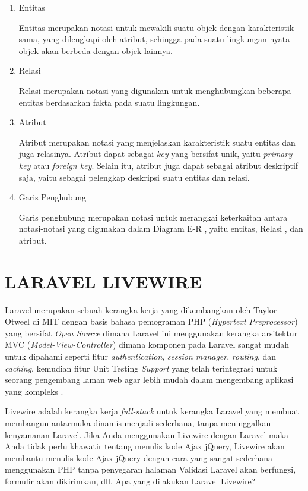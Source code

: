 \begin{enumerate}
	\item Entitas
	\par Entitas merupakan notasi untuk mewakili suatu objek dengan karakteristik sama, yang dilengkapi oleh atribut, sehingga pada suatu lingkungan nyata objek akan berbeda dengan objek lainnya.
	\item Relasi
	\par Relasi merupakan notasi yang digunakan untuk menghubungkan beberapa entitas berdasarkan fakta pada suatu lingkungan.
	\item Atribut
	\par Atribut merupakan notasi yang menjelaskan karakteristik suatu entitas dan juga relasinya. Atribut dapat sebagai \textit{key} yang bersifat unik, yaitu \textit{primary key} atau \textit{foreign key}. Selain itu, atribut juga dapat sebagai atribut deskriptif saja, yaitu sebagai pelengkap deskripsi suatu entitas dan relasi.	
	\item Garis Penghubung
	\par Garis penghubung merupakan notasi untuk merangkai keterkaitan antara notasi-notasi yang digunakan dalam Diagram E-R , yaitu entitas, Relasi , dan atribut.
\end{enumerate}

\section{\uppercase{Laravel Livewire}}
Laravel merupakan sebuah kerangka kerja yang dikembangkan oleh Taylor Otweel di MIT dengan basis bahasa pemograman PHP (\textit{Hypertext Preprocessor}) yang bersifat \textit{Open Source} dimana Laravel ini menggunakan kerangka arsitektur MVC (\textit{Model-View-Controller}) dimana komponen pada Laravel sangat mudah untuk dipahami seperti fitur \textit{authentication}, \textit{session manager}, \textit{routing}, dan \textit{caching}, kemudian fitur Unit Testing \textit{Support} yang telah terintegrasi untuk seorang pengembang laman web agar lebih mudah dalam mengembang aplikasi yang kompleks \citep{sebastian2021perancanagan}.

\par Livewire adalah kerangka kerja \textit{full-stack} untuk kerangka Laravel yang membuat membangun antarmuka dinamis menjadi sederhana, tanpa meninggalkan kenyamanan Laravel. Jika Anda menggunakan Livewire dengan Laravel maka Anda tidak perlu khawatir tentang menulis kode Ajax jQuery, Livewire akan membantu menulis kode Ajax jQuery dengan cara yang sangat sederhana menggunakan PHP tanpa penyegaran halaman Validasi Laravel akan berfungsi, formulir akan dikirimkan, dll. Apa yang dilakukan Laravel Livewire? \citep{krishaweb2021}

